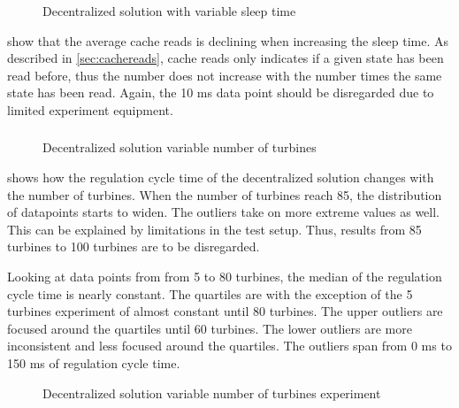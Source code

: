 \begin{figure}[h!]
	\centering
	
	\caption{Decentralized solution with variable sleep time}
	\label{fig:exp:decen:sleep-cache}
\end{figure}

\FloatBarrier

 show that the average cache reads is declining when increasing the sleep time. As described in \cref{sec:cachereads}, cache reads only indicates if a given state has been read before, thus the number does not increase with the number times the same state has been read. Again, the 10 ms data point should be disregarded due to limited experiment equipment.

\clearpage
\subsubsection{}

\begin{figure}[h!]
	\centering
%	
	
	
	\caption{Decentralized solution variable number of turbines}
	\label{fig:exp:decen:turbines}
\end{figure}

 shows how the regulation cycle time of the decentralized solution changes with the number of turbines.
When the number of turbines reach 85, the distribution of datapoints starts to widen. The outliers take on more extreme values as well. This can be explained by limitations in the test setup. Thus, results from 85 turbines to 100 turbines are to be disregarded.

Looking at data points from from 5 to 80 turbines, the median of the regulation cycle time is nearly constant.
The quartiles are with the exception of the 5 turbines experiment of almost constant until 80 turbines. The upper outliers are focused around the quartiles until 60 turbines. The lower outliers are more inconsistent and less focused around the quartiles.
The outliers span from 0 ms to 150 ms of regulation cycle time.

\begin{figure}[h!]
	\centering
	
	\caption{Decentralized solution variable number of turbines experiment}
	\label{fig:exp:decen:turbines_cache}
\end{figure}


